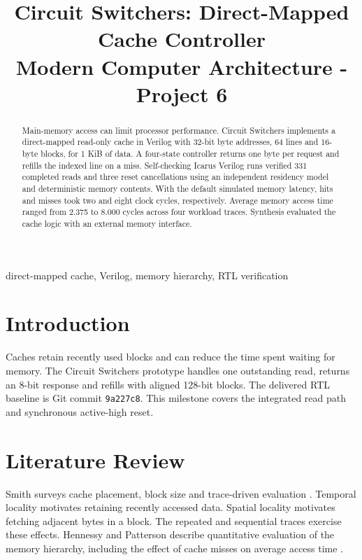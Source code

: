 \documentclass[conference]{IEEEtran}
\begin{document}
\title{Circuit Switchers: Direct-Mapped Cache Controller\\\large Modern Computer Architecture - Project 6}
\author{
}
\maketitle
\begin{abstract}
Main-memory access can limit processor performance. Circuit Switchers implements a direct-mapped read-only cache in Verilog with 32-bit byte addresses, 64 lines and 16-byte blocks, for 1 KiB of data. A four-state controller returns one byte per request and refills the indexed line on a miss. Self-checking Icarus Verilog runs verified 331 completed reads and three reset cancellations using an independent residency model and deterministic memory contents. With the default simulated memory latency, hits and misses took two and eight clock cycles, respectively. Average memory access time ranged from 2.375 to 8.000 cycles across four workload traces. Synthesis evaluated the cache logic with an external memory interface.
\end{abstract}
\begin{IEEEkeywords}direct-mapped cache, Verilog, memory hierarchy, RTL verification\end{IEEEkeywords}

\section{Introduction}
Caches retain recently used blocks and can reduce the time spent waiting for memory. The Circuit Switchers prototype handles one outstanding read, returns an 8-bit response and refills with aligned 128-bit blocks. The delivered RTL baseline is Git commit \texttt{9a227c8}. This milestone covers the integrated read path and synchronous active-high reset.

\section{Literature Review}
Smith surveys cache placement, block size and trace-driven evaluation \cite{smith1982}. Temporal locality motivates retaining recently accessed data. Spatial locality motivates fetching adjacent bytes in a block. The repeated and sequential traces exercise these effects. Hennessy and Patterson describe quantitative evaluation of the memory hierarchy, including the effect of cache misses on average access time \cite{hennessy2017}.
\end{document}
